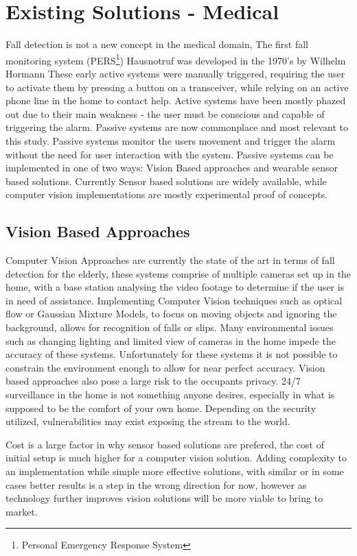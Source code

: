 \section{Existing Solutions - Medical}
Fall detection is not a new concept in the medical domain, The first fall monitoring system (PERS\footnote{Personal Emergency Response System}) Hausnotruf  was developed in the 1970’s by Wilhelm Hormann  These early active systems were manually triggered, requiring the user to activate them by pressing a button on a transceiver, while relying on an active phone line in the home to contact help. Active systems have been mostly phazed out due to their main weakness - the user must be conscious and capable of triggering the alarm. Passive systems are now commonplace and most relevant to this study. Passive systems monitor the users movement and trigger the alarm without the need for user interaction with the system. Passive systems can be implemented in one of two ways: Vision Based approaches and wearable sensor based solutions. Currently Sensor based solutions are widely available, while computer vision implementations are mostly experimental proof of concepts.  


\subsection{Vision Based Approaches}
Computer Vision Approaches are currently the state of the art in terms of fall detection for the elderly, these systems comprise of multiple cameras set up in the home, with a base station analysing the video footage to determine if the user is in need of assistance. Implementing Computer Vision techniques such as optical flow or Gaussian Mixture Models, to focus on moving objects and ignoring the background, allows for recognition of falls or slips. Many environmental issues such as changing lighting and limited view of cameras in the home impede the accuracy of these systems. Unfortunately for these systems it is not possible to constrain the environment enough to allow for near perfect accuracy.
Vision based approaches also pose a large risk to the occupants privacy. 24/7 surveillance in the home is not something anyone desires, especially in what is supposed to be the comfort of your own home. Depending on the security utilized, vulnerabilities may exist exposing the stream to the world.

Cost is a large factor in why sensor based solutions are prefered, the cost of initial setup is much higher for a computer vision solution. Adding complexity to an implementation while simple more effective solutions, with similar or in some cases better results is a step in the wrong direction for now, however as technology further improves vision solutions will be more viable to bring to market.

